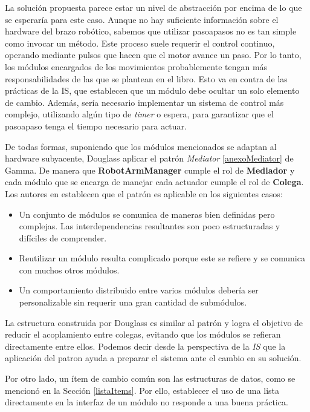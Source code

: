 La solución propuesta parece estar un nivel de abstracción por encima de lo que se esperaría para este caso. Aunque no hay suficiente información sobre el hardware del brazo robótico, sabemos que utilizar \glspl{pasoapaso} no es tan simple como invocar un método. Este proceso suele requerir el control continuo, operando mediante pulsos que hacen que el motor avance un paso. Por lo tanto, los módulos encargados de los movimientos probablemente tengan más responsabilidades de las que se plantean en el libro. Esto va en contra de las prácticas de la \gls{IS}, que establecen que un módulo debe ocultar un solo elemento de cambio. Además, sería necesario implementar un sistema de control más complejo, utilizando algún tipo de \textit{timer} o espera, para garantizar que el \gls{pasoapaso} tenga el tiempo necesario para actuar.

De todas formas, suponiendo que los módulos mencionados se adaptan al hardware subyacente, Douglass aplicar el patrón \textit{Mediator} \ref{anexoMediator} de Gamma. De manera que \textbf{RobotArmManager} cumple el rol de \textbf{Mediador} y cada módulo que se encarga de manejar cada actuador cumple el rol de \textbf{Colega}. Los autores en \cite{Gamma:1995:DPE:186897} establecen que el patrón es aplicable en los siguientes casos:
\begin{itemize}
\item Un conjunto de módulos se comunica de maneras bien definidas pero complejas. Las interdependencias resultantes son poco estructuradas y difíciles de comprender.

\item Reutilizar un módulo resulta complicado porque este se refiere y se comunica con muchos otros módulos.

\item Un comportamiento distribuido entre varios módulos debería ser personalizable sin requerir una gran cantidad de submódulos.
\end{itemize}

La estructura construida por Douglass es similar al patrón y logra el objetivo de reducir el acoplamiento entre colegas, evitando que los módulos se refieran directamente entre ellos. Podemos decir desde la perspectiva de la \textit{IS} que la aplicación del patron ayuda a preparar el sistema ante el cambio en su solución.

Por otro lado, un ítem de cambio común son las estructuras de datos, como se mencionó en la Sección \ref{listaItems}. Por ello, establecer el uso de una lista directamente en la interfaz de un módulo no responde a una buena práctica.

